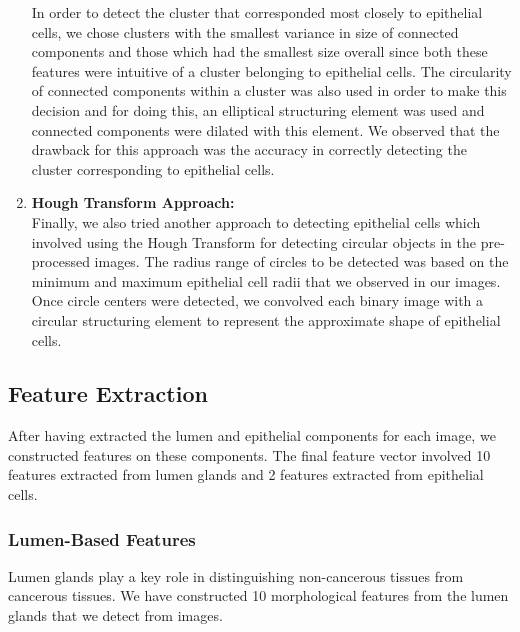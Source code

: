 \begin{enumerate}
\begin{enumerate}
\end{enumerate}

In order to detect the cluster that corresponded most closely to epithelial cells, we chose clusters with the smallest variance in size of connected components and those which had the smallest size overall since both these features were intuitive of a cluster belonging to epithelial cells. The circularity of connected components within a cluster was also used in order to make this decision and for doing this, an elliptical structuring element was used and connected components were dilated with this element. We observed that the drawback for this approach was the accuracy in correctly detecting the cluster corresponding to epithelial cells.

\item \textbf{Hough Transform Approach:}\\
Finally, we also tried another approach to detecting epithelial cells which involved using the Hough Transform \cite{hough} for detecting circular objects in the pre-processed images. The radius range of circles to be detected was based on the minimum and maximum epithelial cell radii that we observed in our images. Once circle centers were detected, we convolved each binary image with a circular structuring element to represent the approximate shape of epithelial cells.

\end{enumerate} 


\subsection{Feature Extraction}
After having extracted the lumen and epithelial components for each image, we constructed features on these components. The final feature vector involved 10 features extracted from lumen glands and 2 features extracted from epithelial cells.

\subsubsection{Lumen-Based Features}
Lumen glands play a key role in distinguishing non-cancerous tissues from cancerous tissues. We have constructed 10 morphological features from the lumen glands that we detect from images.

